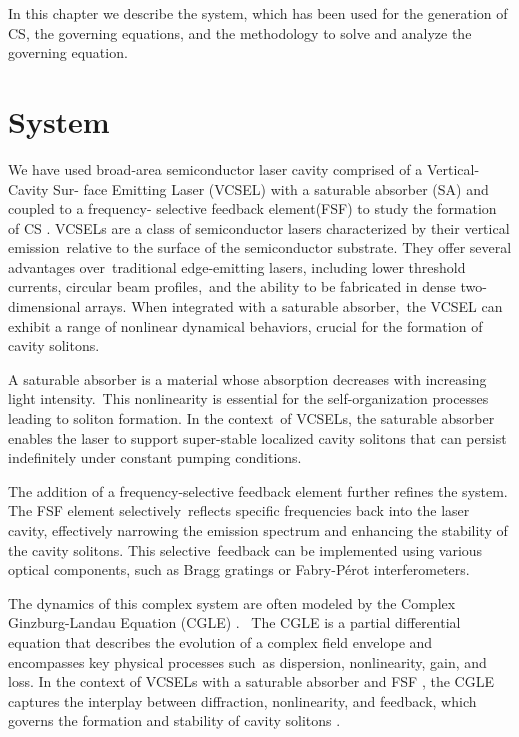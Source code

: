 In this chapter we describe the system, which has been used for the generation of CS, the governing equations,  and the methodology to solve and analyze the governing equation. 
\section{System}
We have used broad-area semiconductor laser cavity comprised of a Vertical-Cavity Sur-
face Emitting Laser (VCSEL) with a saturable absorber (SA) and coupled to a frequency-
selective feedback element(FSF) to study the formation of CS \cite{hachairCavitySolitonsBroad2004}. VCSELs are a class of semiconductor lasers characterized by their vertical emission\
relative to the surface of the semiconductor substrate. They offer several advantages over\
traditional edge-emitting lasers, including lower threshold currents, circular beam profiles,\ 
and the ability to be fabricated in dense two-dimensional arrays. When integrated with a saturable absorber,\
the VCSEL can exhibit a range of nonlinear dynamical behaviors, crucial for the formation of cavity solitons.

A saturable absorber is a material whose absorption decreases with increasing light intensity.\
This nonlinearity is essential for the self-organization processes leading to soliton formation. In the context\
of VCSELs, the saturable absorber enables the laser to support super-stable localized cavity solitons that can persist indefinitely under constant pumping conditions.

The addition of a frequency-selective feedback element further refines the system. The FSF element selectively\
reflects specific frequencies back into the laser cavity, effectively narrowing the emission spectrum and enhancing the stability of the cavity solitons. This selective\
feedback can be implemented using various optical components, such as Bragg gratings or Fabry-Pérot interferometers.

The dynamics of this complex system are often modeled by the Complex Ginzburg-Landau Equation (CGLE) \cite{chatePhaseDiagramTwodimensional1996,ComplexGinzburgLandauEquation,mayteevarunyooOneTwodimensionalModes2018}. \
The CGLE is a partial differential equation that describes the evolution of a complex field envelope and encompasses key physical processes such\
as dispersion, nonlinearity, gain, and loss. In the context of VCSELs with a saturable absorber and FSF \cite{bacheCavitySolitonLaser2005a,firthCavitySolitonProperties2009}, 
the CGLE captures the interplay between diffraction, nonlinearity, and feedback, which governs the formation and stability of cavity solitons \cite{nagiBroadbandCavitySoliton2022,kaurGenerationDynamicsOne2017a}.

